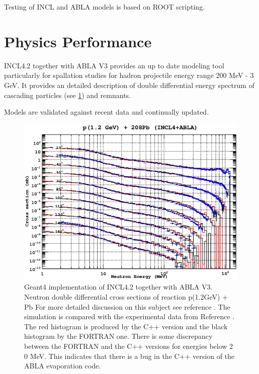 Testing of INCL and ABLA models is based on ROOT \cite{Brun97a} scripting.

\section{Physics Performance}
INCL4.2 together with ABLA V3 provides an up to date modeling tool particularly for spallation
studies for hadron projectile energy range 200 MeV - 3 GeV. 
It provides an detailed description of double differential
energy spectrum of cascading particles (see \ref{fig:pPbDoubleDifferential}) and remnants.

Models are validated against recent data and continually updated.

\begin{figure}
\begin{center}
\includegraphics[angle=0,scale=0.65]{pPbDoubleDifferential.eps}
\end{center}
\caption{Geant4 implementation of INCL4.2 together with ABLA
  V3. Neutron double differential cross sections of reaction p(1.2GeV)
  + Pb For more detailed discussion on this subject
see reference \cite{Boudard02a}. The simulation is compared with the
experimental data from Reference \cite{boudard02a}. The red histogram
is produced by the C++ version and the black histogram by the FORTRAN
one. There is some discrepancy between the FORTRAN and the C++
versions for energies below 2 0 MeV. This indicates that there is a
bug in the C++ version of the ABLA evaporation code.}
\label{fig:pPbDoubleDifferential}
\end{figure}

